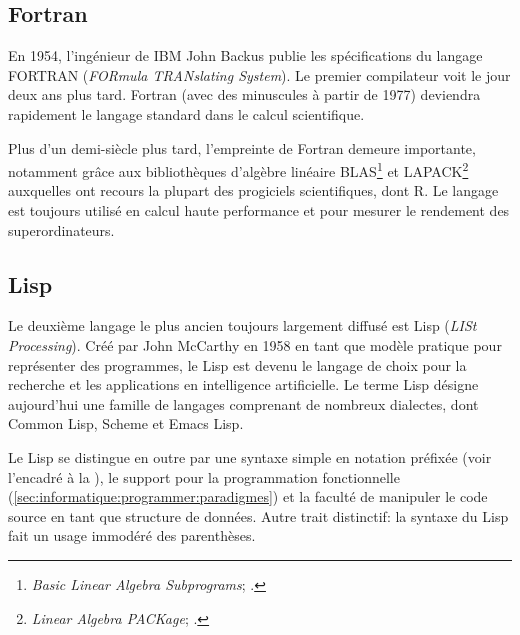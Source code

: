 \subsection{Fortran}
\label{sec:informatique:historique:fortran}

En 1954, l'ingénieur de IBM John Backus publie les spécifications du
langage FORTRAN (\emph{FORmula TRANslating System}). Le
premier compilateur voit le jour deux ans plus tard. Fortran (avec des
minuscules à partir de 1977) deviendra rapidement le langage standard
dans le calcul scientifique.

Plus d'un demi-siècle plus tard, l'empreinte de Fortran demeure
importante, notamment grâce aux bibliothèques d'algèbre linéaire
BLAS\footnote{%
  \emph{Basic Linear Algebra Subprograms};
  .} %
et LAPACK\footnote{%
  \emph{Linear Algebra PACKage};
  .} %
auxquelles ont recours la plupart des progiciels scientifiques, dont
R. Le langage est toujours utilisé en calcul haute performance et pour
mesurer le rendement des superordinateurs.


\subsection{Lisp}
\label{sec:informatique:historique:lisp}

Le deuxième langage le plus ancien toujours largement diffusé est
Lisp (\emph{LISt Processing}). Créé par John McCarthy en
1958 en tant que modèle pratique pour représenter des programmes, le
Lisp est devenu le langage de choix pour la recherche et les
applications en intelligence artificielle. Le terme Lisp désigne
aujourd'hui une famille de langages comprenant de nombreux dialectes,
dont Common Lisp, Scheme et Emacs Lisp.

Le Lisp se distingue en outre par une syntaxe simple en
notation préfixée (voir l'encadré à la
), le support pour la
programmation fonctionnelle
(\autoref{sec:informatique:programmer:paradigmes}) et la faculté de
manipuler le code source en tant que structure de données. Autre trait
distinctif: la syntaxe du Lisp fait un usage immodéré des parenthèses.

